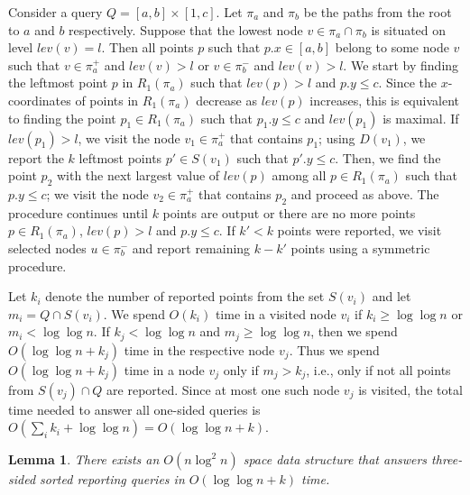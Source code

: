 \documentclass[11pt]{article}
\newcommand{\no}[1]{}
\newtheorem{lemma}{Lemma}
\begin{document}
Consider a query $Q=[a,b]\times [1,c]$.  Let $\pi_a$ and $\pi_b$ be
the paths from the root to $a$ and $b$ respectively. Suppose that the
lowest node $v\in \pi_a\cap\pi_b$ is situated on level $lev(v)=l$. Then
all points $p$ such that $p.x\in [a,b]$ belong to some node $v$ such
that $v\in \pi_a^+$ and $lev(v)> l$ or $v\in \pi^-_b$ and $lev(v)>l$.
We start by finding the leftmost point $p$ in $R_1(\pi_a)$ such that
$lev(p)>l$ and $p.y\leq c$. 
Since the $x$-coordinates of points in
$R_1(\pi_a)$ decrease as $lev(p)$ increases, this is equivalent to
finding the point $p_1\in R_1(\pi_a)$ such that $p_1.y \leq c$ and $lev(p_1)$ is maximal.
If $lev(p_1)>l$, we visit the node $v_1\in \pi^+_a$ that contains $p_1$; \no{We find the highest point  $p_l\in L(v_1)$, $p_l.y\le c$. If $p_l$ is the last (highest) point in $L(v_1)$, then $S(v_1)$  
contains at least $\log \log n$ points $p$, such that $p.y\le c$. Otherwise $p_l$ is the highest among all $p\in S(v_1)$ 
such that $p\le c$.
Then, we use $D(v_l)$ to report the $k$ leftmost points $p'\in S(v)$ such that $p'.y\le c$. 

If $p_1$ is not the highest point in $L(v_1)$, then $p.y \le p_l.y$ for any $p\in S(v_1)$ such that $p.y\le c$. 
}
 using $D(v_1)$, we report the $k$ leftmost points $p'\in S(v_1)$ such that $p'.y\le c$. 
Then, we find the point $p_2$ with the next largest value of 
$lev(p)$ among all $p\in R_1(\pi_a)$ such that $p.y\le c$; we visit the node 
$v_2\in \pi^+_a$ that contains $p_2$ and proceed as above. 
The procedure continues until $k$ points are output or there are no 
more points $p\in R_1(\pi_a)$, $lev(p)>l$ and $p.y\le c$. 
If $k'<k$ points were reported, we visit selected nodes $u\in \pi^-_b$ and report remaining $k-k'$ points using a symmetric procedure. 

Let $k_i$ denote the number of reported points from the set $S(v_i)$ 
and let $m_i=Q\cap S(v_i)$. 
We spend $O(k_i)$ time in a visited node $v_i$ if $k_i\ge \log \log n$
or $m_i< \log \log n$. If  $k_j<\log\log n$ and $m_j\ge \log \log n$, then we spend 
$O(\log \log n +k_j)$ time in the respective node $v_j$. 
Thus we spend $O(\log \log n + k_j)$ time in a node $v_j$
only if $m_j>k_j$, i.e., only if not all points from $S(v_j)\cap Q$
are reported.
Since at most one such 
node $v_j$ is visited, the total time needed to answer all one-sided queries is $O(\sum_i k_i + \log \log n)=O(\log \log n + k)$. 
\no{
in the decreasing order of $lev(p)$. For every found point $p\in
R_1(\pi_a)$, we visit the node $v\in \pi^+_a$ that contains $v$.
Using $D(v)$, we report the $k$ leftmost points $p'\in S(v)$ such that
$p'.y\le c$. 
}
\begin{lemma}\label{lemma:3sid}
  There exists an $O(n\log^2 n)$ space data structure that answers
  three-sided sorted reporting queries in $O(\log \log n + k)$ time.
\end{lemma}
\end{document}
